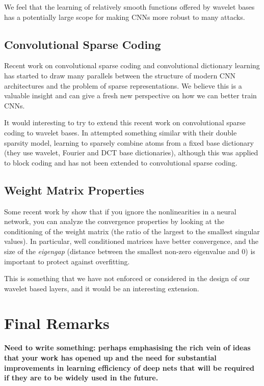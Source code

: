 We feel that the learning of relatively smooth functions offered by wavelet bases has a potentially
large scope for making CNNs more robust to many attacks.

\subsection{Convolutional Sparse Coding}
Recent work on convolutional sparse coding and convolutional
dictionary learning \cite{liu_online_2017, liu_first_2017,
papyan_convolutional_2016, papyan_convolutional_2017, papyan_theoretical_2018}
has started to draw many parallels between the
structure of modern CNN architectures and the problem of sparse
representations. We believe this is a valuable insight and can give a fresh new
perspective on how we can better train CNNs.

It would interesting to try to extend this recent work on
convolutional sparse coding to wavelet bases. In \cite{rubinstein_double_2010}
\citeauthor{rubinstein_double_2010} attempted something similar with their
double sparsity model, learning to sparsely combine atoms from a fixed base
dictionary (they use wavelet, Fourier and DCT base dictionaries), although this
was applied to block coding and has not been extended to convolutional sparse coding.

\subsection{Weight Matrix Properties}
Some recent work by \citeauthor{advani_high-dimensional_2017}
\cite{advani_high-dimensional_2017} show that if you ignore the
nonlinearities in a neural network, you can analyze the convergence properties
by looking at the conditioning of the weight matrix (the ratio of the largest to
the smallest singular values). In particular, well conditioned matrices have
better convergence, and the size of the \emph{eigengap} (distance between the
smallest non-zero eigenvalue and 0) is important to protect against overfitting.

This is something that we have not enforced or considered in the design of our
wavelet based layers, and it would be an interesting extension.

\section{Final Remarks}
\textbf{
 Need to write something: perhaps emphasising the rich vein of ideas that your work has opened up and the
 need for substantial improvements in learning efficiency of deep nets that will
 be required if they are to be widely used in the future.}
